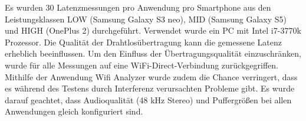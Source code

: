 Es wurden 30 Latenzmessungen pro Anwendung pro Smartphone aus den Leistungsklassen LOW (Samsung Galaxy S3 neo), MID (Samsung Galaxy S5) und HIGH (OnePlus 2) durchgeführt. Verwendet wurde ein PC mit Intel i7-3770k Prozessor. Die Qualität der Drahtlosübertragung kann die gemessene Latenz erheblich beeinflussen. Um den Einfluss der Übertragungsqualität einzuschränken, wurde für alle Messungen auf eine WiFi-Direct-Verbindung zurückgegriffen. Mithilfe der Anwendung Wifi Analyzer wurde zudem die Chance verringert, dass es während des Testens durch Interferenz verursachten Probleme gibt. Es wurde darauf geachtet, dass Audioqualität (48 kHz Stereo) und Puffergrößen bei allen Anwendungen gleich konfiguriert sind.